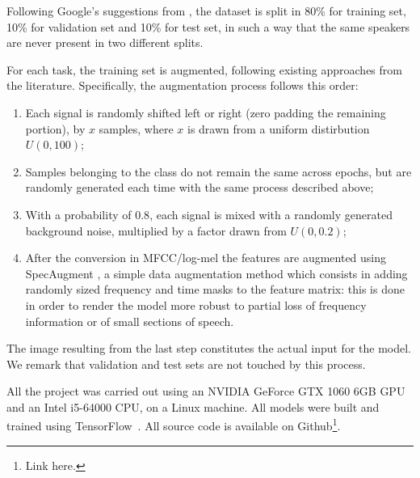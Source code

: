 Following Google's suggestions from \cite{speechdataset2018warden}, the dataset is split in 80\% for training set, 10\% for validation set and 10\% for test set, in such a way that the same speakers are never present in two different splits. 

For each task, the training set is augmented, following existing approaches from the literature. Specifically, the augmentation process follows this order:
\begin{enumerate}
	\item Each signal is randomly shifted left or right (zero padding the remaining portion), by $x$ samples, where $x$ is drawn from a uniform distirbution $U(0,100)$;
	\item Samples belonging to the  class do not remain the same across epochs, but are randomly generated each time with the same process described above;
	\item With a probability of $0.8$, each signal is mixed with a randomly generated background noise, multiplied by a factor drawn from $U(0,0.2)$; 
	\item After the conversion in MFCC/log-mel %
		the features are augmented using SpecAugment \cite{park2019specaugment}, a simple data augmentation method which consists in adding randomly sized frequency and time masks to the feature matrix: this is done in order to render the model more robust to partial loss of frequency information or of small sections of speech.
\end{enumerate}

The image resulting from the last step constitutes the actual input for the model. We remark that validation and test sets are not touched by this process.

All the project was carried out using an NVIDIA GeForce GTX 1060 6GB GPU and an Intel i5-64000 CPU, on a Linux machine. All models were built and trained using TensorFlow~\cite{Abadi2016TensorFlowAS}. All source code is available on Github\footnote{Link here.}. %

